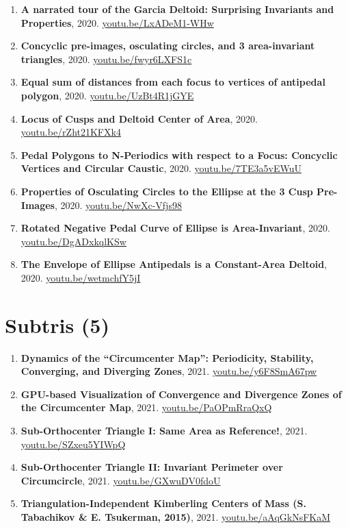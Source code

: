 \documentclass[12pt]{article}
\begin{document}
\begin{enumerate}[resume]
\item \textbf{A narrated tour of the Garcia Deltoid: Surprising Invariants and Properties}, 2020. \href{https://youtu.be/LxADeM1-WHw}{\url{youtu.be/LxADeM1-WHw}}
\item \textbf{Concyclic pre-images, osculating circles, and 3 area-invariant triangles}, 2020. \href{https://youtu.be/fwyr6LXFS1c}{\url{youtu.be/fwyr6LXFS1c}}
\item \textbf{Equal sum of distances from each focus to vertices of antipedal polygon}, 2020. \href{https://youtu.be/UzBt4R1jGYE}{\url{youtu.be/UzBt4R1jGYE}}
\item \textbf{Locus of Cusps and Deltoid Center of Area}, 2020. \href{https://youtu.be/rZht21KFXk4}{\url{youtu.be/rZht21KFXk4}}
\item \textbf{Pedal Polygons to N-Periodics with respect to a Focus: Concyclic Vertices and Circular Caustic}, 2020. \href{https://youtu.be/7TE3a5vEWuU}{\url{youtu.be/7TE3a5vEWuU}}
\item \textbf{Properties of Osculating Circles to the Ellipse at the 3 Cusp Pre-Images}, 2020. \href{https://youtu.be/NwXc-Vfjs98}{\url{youtu.be/NwXc-Vfjs98}}
\item \textbf{Rotated Negative Pedal Curve of Ellipse is Area-Invariant}, 2020. \href{https://youtu.be/DgADxkqlKSw}{\url{youtu.be/DgADxkqlKSw}}
\item \textbf{The Envelope of Ellipse Antipedals is a Constant-Area Deltoid}, 2020. \href{https://youtu.be/wetmchfY5jI}{\url{youtu.be/wetmchfY5jI}}
\end{enumerate}

\section{Subtris (5)}

\begin{enumerate}[resume]
\item \textbf{Dynamics of the ``Circumcenter Map'': Periodicity, Stability, Converging, and Diverging Zones}, 2021. \href{https://youtu.be/y6F8SmA67pw}{\url{youtu.be/y6F8SmA67pw}}
\item \textbf{GPU-based Visualization of Convergence and Divergence Zones of the Circumcenter Map}, 2021. \href{https://youtu.be/PaOPmRraQxQ}{\url{youtu.be/PaOPmRraQxQ}}
\item \textbf{Sub-Orthocenter Triangle I: Same Area as Reference!}, 2021. \href{https://youtu.be/SZxeu5YIWpQ}{\url{youtu.be/SZxeu5YIWpQ}}
\item \textbf{Sub-Orthocenter Triangle II: Invariant Perimeter over Circumcircle}, 2021. \href{https://youtu.be/GXwuDV0fdoU}{\url{youtu.be/GXwuDV0fdoU}}
\item \textbf{Triangulation-Independent Kimberling Centers of Mass (S. Tabachikov \& E. Tsukerman, 2015)}, 2021. \href{https://youtu.be/aAqGkNsFKaM}{\url{youtu.be/aAqGkNsFKaM}}
\end{enumerate}
\end{document}
